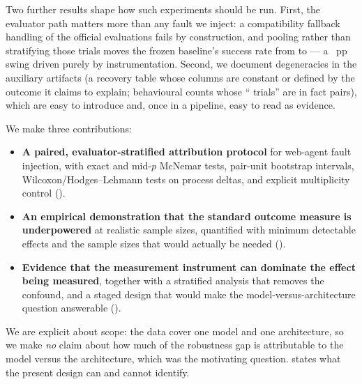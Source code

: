 Two further results shape how such experiments should be run. First, the
evaluator path matters more than any fault we inject: a compatibility fallback
handling \OfficialFallbackN{} of the \OfficialN{} official evaluations fails by
construction, and pooling rather than stratifying those trials moves the frozen
baseline's success rate from \BaseNativeRate{} to \BasePooledRate{} --- a
\BaselineSwing{}~pp swing driven purely by instrumentation. Second, we document
degeneracies in the auxiliary artifacts (a recovery table whose columns are
constant or defined by the outcome it claims to explain; behavioural counts whose
``\TotalTrials{} trials'' are in fact \MatrixPairs{} pairs), which are easy to
introduce and, once in a pipeline, easy to read as evidence.

We make three contributions:
\begin{itemize}
  \item \textbf{A paired, evaluator-stratified attribution protocol} for web-agent
  fault injection, with exact and mid-$p$ McNemar tests, pair-unit bootstrap
  intervals, Wilcoxon/Hodges--Lehmann tests on process deltas, and explicit
  multiplicity control ().
  \item \textbf{An empirical demonstration that the standard outcome measure is
  underpowered} at realistic sample sizes, quantified with minimum detectable
  effects and the sample sizes that would actually be needed
  ().
  \item \textbf{Evidence that the measurement instrument can dominate the effect
  being measured}, together with a stratified analysis that removes the
  confound, and a staged design that would make the model-versus-architecture
  question answerable ().
\end{itemize}

We are explicit about scope: the data cover one model and one architecture, so we
make \emph{no} claim about how much of the robustness gap is attributable to the
model versus the architecture, which was the motivating question.
 states what the present design can and cannot identify.
